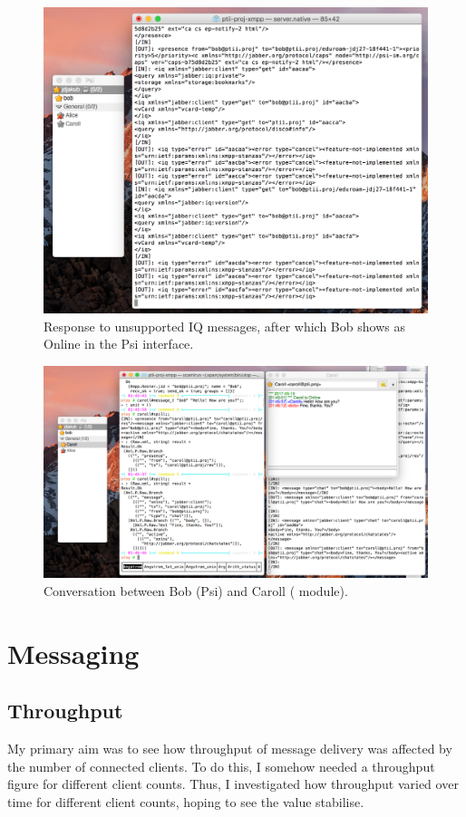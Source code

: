 \begin{figure}
  \centering\includegraphics[width=\textwidth]{../transcripts/iq_errors.png}
  \caption{Response to unsupported IQ messages, after which Bob shows as Online in the Psi interface.}
  \label{fig:iq-errors}
\end{figure}

\begin{figure}
  \centering\includegraphics[width=\textwidth]{../transcripts/caroll_msg.png}
  \caption{Conversation between Bob (Psi) and Caroll ( module).}
  \label{fig:caroll-msg}
\end{figure}

\section{Messaging}
\subsection{Throughput}
My primary aim was to see how throughput of message delivery was affected by the number of connected clients. To do this, I somehow needed a throughput figure for different client counts. Thus, I investigated how throughput varied over time for different client counts, hoping to see the value stabilise.

